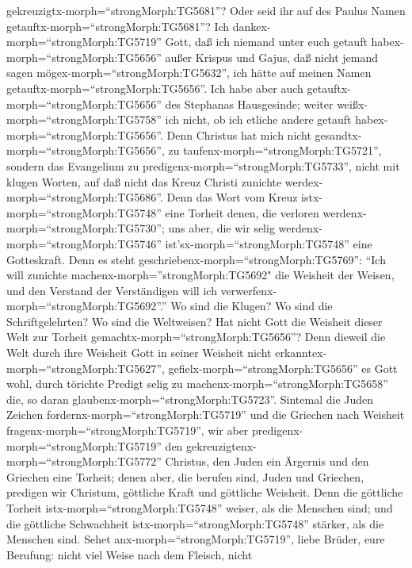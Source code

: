gekreuzigtx-morph=``strongMorph:TG5681''? Oder seid ihr auf des Paulus
Namen getauftx-morph=``strongMorph:TG5681''?  Ich
dankex-morph=``strongMorph:TG5719'' Gott, daß ich niemand unter euch
getauft habex-morph=``strongMorph:TG5656'' außer Krispus und Gajus,
 daß nicht jemand sagen mögex-morph=``strongMorph:TG5632'',
ich hätte auf meinen Namen getauftx-morph=``strongMorph:TG5656''.
 Ich habe aber auch getauftx-morph=``strongMorph:TG5656''
des Stephanas Hausgesinde; weiter weißx-morph=``strongMorph:TG5758'' ich
nicht, ob ich etliche andere getauft habex-morph=``strongMorph:TG5656''.
 Denn Christus hat mich nicht
gesandtx-morph=``strongMorph:TG5656'', zu
taufenx-morph=``strongMorph:TG5721'', sondern das Evangelium zu
predigenx-morph=``strongMorph:TG5733'', nicht mit klugen Worten, auf daß
nicht das Kreuz Christi zunichte werdex-morph=``strongMorph:TG5686''.
 Denn das Wort vom Kreuz istx-morph=``strongMorph:TG5748''
eine Torheit denen, die verloren werdenx-morph=``strongMorph:TG5730'';
uns aber, die wir selig werdenx-morph=``strongMorph:TG5746''
ist'sx-morph=``strongMorph:TG5748'' eine Gotteskraft.  Denn
es steht geschriebenx-morph=``strongMorph:TG5769'': ``Ich will zunichte
machenx-morph=''strongMorph:TG5692" die Weisheit der Weisen, und den
Verstand der Verständigen will ich
verwerfenx-morph=``strongMorph:TG5692''.''  Wo sind die
Klugen? Wo sind die Schriftgelehrten? Wo sind die Weltweisen? Hat nicht
Gott die Weisheit dieser Welt zur Torheit
gemachtx-morph=``strongMorph:TG5656''?  Denn dieweil die
Welt durch ihre Weisheit Gott in seiner Weisheit nicht
erkanntex-morph=``strongMorph:TG5627'',
gefielx-morph=``strongMorph:TG5656'' es Gott wohl, durch törichte
Predigt selig zu machenx-morph=``strongMorph:TG5658'' die, so daran
glaubenx-morph=``strongMorph:TG5723''.  Sintemal die Juden
Zeichen fordernx-morph=``strongMorph:TG5719'' und die Griechen nach
Weisheit fragenx-morph=``strongMorph:TG5719'',  wir aber
predigenx-morph=``strongMorph:TG5719'' den
gekreuzigtenx-morph=``strongMorph:TG5772'' Christus, den Juden ein
Ärgernis und den Griechen eine Torheit;  denen aber, die
berufen sind, Juden und Griechen, predigen wir Christum, göttliche Kraft
und göttliche Weisheit.  Denn die göttliche Torheit
istx-morph=``strongMorph:TG5748'' weiser, als die Menschen sind; und die
göttliche Schwachheit istx-morph=``strongMorph:TG5748'' stärker, als die
Menschen sind.  Sehet anx-morph=``strongMorph:TG5719'',
liebe Brüder, eure Berufung: nicht viel Weise nach dem Fleisch, nicht
